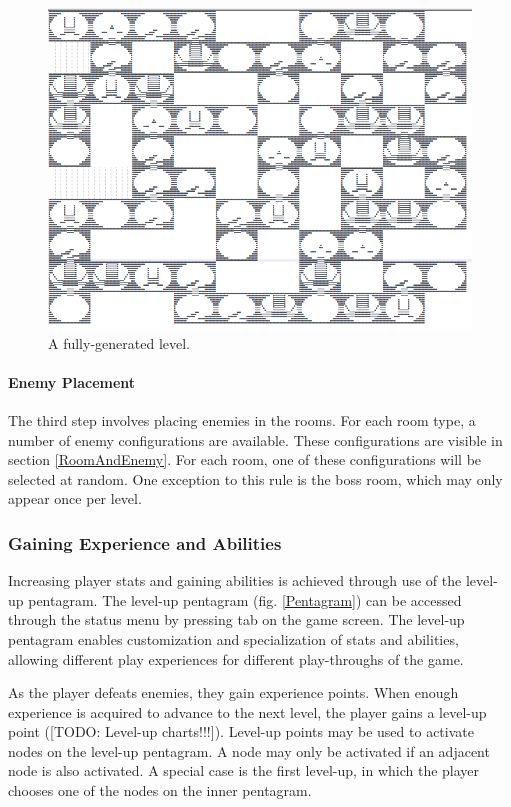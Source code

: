 \documentclass{article}
\begin{document}
\begin{figure}[h!]

\includegraphics[width=5in]{Graphics/textmaze.png}
\caption{A fully-generated level.}
\label{TextLevel}

\end{figure}

\paragraph{Enemy Placement}
The third step involves placing enemies in the rooms.  For each room type, a number of enemy configurations are available.  These configurations are visible in section \ref{RoomAndEnemy}.  For each room, one of these configurations will be selected at random.  One exception to this rule is the boss room, which may only appear once per level.

\subsubsection{Gaining Experience and Abilities}

Increasing player stats and gaining abilities is achieved through use of the level-up pentagram.  The level-up pentagram (fig. \ref{Pentagram}) can be accessed through the status menu by pressing tab on the game screen.  The level-up pentagram enables customization and specialization of stats and abilities, allowing different play experiences for different play-throughs of the game.

As the player defeats enemies, they gain experience points.  When enough experience is acquired to advance to the next level, the player gains a level-up point ([TODO: Level-up charts!!!]).  Level-up points may be used to activate nodes on the level-up pentagram.  A node may only be activated if an adjacent node is also activated.  A special case is the first level-up, in which the player chooses one of the nodes on the inner pentagram.
\end{document}
